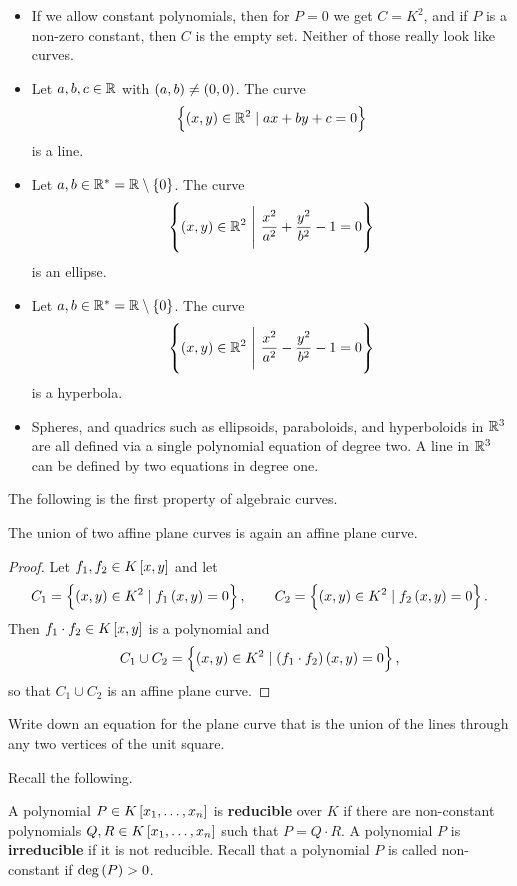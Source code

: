 \begin{example}
\hfill
\begin{itemize}
\item If we allow constant polynomials, then for $ P = 0 $ we get $ C = K^2 $, and if $ P $ is a non-zero constant, then $ C $ is the empty set. Neither of those really look like curves.
\item Let $ a, b, c \in \mathbb{R} $ with $ \br{a, b} \ne \br{0, 0} $. The curve
$$ \cbr{\br{x, y} \in \R^2 \mid ax + by + c = 0} $$
is a line.
\item Let $ a, b \in \R^* = \R \setminus \cbr{0} $. The curve
$$ \cbr{\br{x, y} \in \R^2 \ \Bigg| \ \dfrac{x^2}{a^2} + \dfrac{y^2}{b^2} - 1 = 0} $$
is an ellipse.
\item Let $ a, b \in \R^* = \R \setminus \cbr{0} $. The curve
$$ \cbr{\br{x, y} \in \R^2 \ \Bigg| \ \dfrac{x^2}{a^2} - \dfrac{y^2}{b^2} - 1 = 0} $$
is a hyperbola.
\item Spheres, and quadrics such as ellipsoids, paraboloids, and hyperboloids in $ \mathbb{R}^3 $ are all defined via a single polynomial equation of degree two. A line in $ \mathbb{R}^3 $ can be defined by two equations in degree one.
\end{itemize}
\end{example}

\pagebreak

The following is the first property of algebraic curves.

\begin{lemma}
\label{lem:1.7}
The union of two affine plane curves is again an affine plane curve.
\end{lemma}

\begin{proof}
Let $ f_1, f_2 \in K\sbr{x, y} $ and let
$$ C_1 = \cbr{\br{x, y} \in K^2 \mid f_1\br{x, y} = 0}, \qquad C_2 = \cbr{\br{x, y} \in K^2 \mid f_2\br{x, y} = 0}. $$
Then $ f_1 \cdot f_2 \in K\sbr{x, y} $ is a polynomial and
$$ C_1 \cup C_2 = \cbr{\br{x, y} \in K^2 \mid \br{f_1 \cdot f_2}\br{x, y} = 0}, $$
so that $ C_1 \cup C_2 $ is an affine plane curve.
\end{proof}

\begin{exercise}
Write down an equation for the plane curve that is the union of the lines through any two vertices of the unit square.
\end{exercise}

Recall the following.

\begin{definition}
A polynomial $ P \in K\sbr{x_1, \dots, x_n} $ is \textbf{reducible} over $ K $ if there are non-constant polynomials $ Q, R \in K\sbr{x_1, \dots, x_n} $ such that $ P = Q \cdot R $. A polynomial $ P $ is \textbf{irreducible} if it is not reducible. Recall that a polynomial $ P $ is called non-constant if $ \deg\br{P} > 0 $.
\end{definition}

